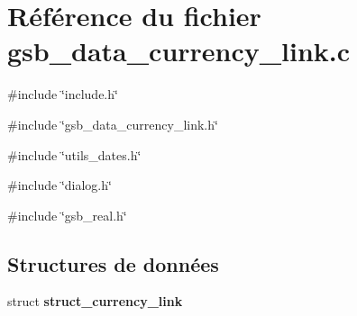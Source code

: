 \section{Référence du fichier gsb\_\-data\_\-currency\_\-link.c}
\label{gsb__data__currency__link_8c}
{\ttfamily \#include \char`\"{}include.h\char`\"{}}\par
{\ttfamily \#include \char`\"{}gsb\_\-data\_\-currency\_\-link.h\char`\"{}}\par
{\ttfamily \#include \char`\"{}utils\_\-dates.h\char`\"{}}\par
{\ttfamily \#include \char`\"{}dialog.h\char`\"{}}\par
{\ttfamily \#include \char`\"{}gsb\_\-real.h\char`\"{}}\par
\subsection*{Structures de données}
\begin{DoxyCompactItemize}
\item 
struct {\bf struct\_\-currency\_\-link}
\end{DoxyCompactItemize}
